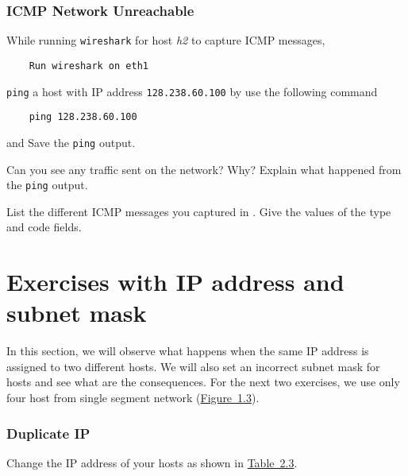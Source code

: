 \documentclass{UTNetLab}
\begin{document}
\section{ICMP Network Unreachable}
   While running \lstinline{wireshark} for host \textit{h2} to capture ICMP messages,
    
    \begin{lstlisting}
    Run wireshark on eth1
    \end{lstlisting}
    
     \lstinline{ping} a host with IP address \lstinline{128.238.60.100} by use the following command
    
    \begin{lstlisting}
    ping 128.238.60.100
    \end{lstlisting}
    
    and Save the \lstinline{ping} output.
    
    \begin{report}
        \item Can you see any traffic sent on the network? Why? Explain what happened from the \lstinline{ping} output.

        \item List the different ICMP messages you captured in .
            Give the values of the type and code fields.
    \end{report}

\part{Exercises with IP address and subnet mask}
    In this section, we will observe what happens when the same IP address is assigned to two different hosts.
    We will also set an incorrect subnet mask for hosts and see what are the consequences.
    For the next two exercises, we use only four host from single segment network (\hyperref[fig:1.3]{Figure~1.3}).

\section{Duplicate IP}\label{sec:duplicate-ip}
    Change the IP address of your hosts as shown in \hyperref[tab:2.3]{Table~2.3}.
\end{document}
